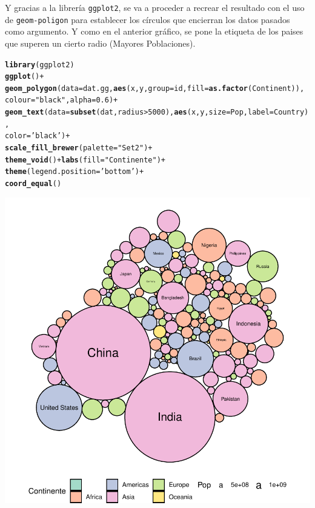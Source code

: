 \documentclass{article}\usepackage[]{graphicx}\usepackage[]{color}
\makeatletter
\def\maxwidth{ %
  \ifdim\Gin@nat@width>\linewidth
    \linewidth
  \else
    \Gin@nat@width
  \fi
}
\newcommand{\hlnum}[1]{\textcolor[rgb]{0.686,0.059,0.569}{#1}}%
\newcommand{\hlstr}[1]{\textcolor[rgb]{0.192,0.494,0.8}{#1}}%
\newcommand{\hlopt}[1]{\textcolor[rgb]{0,0,0}{#1}}%
\newcommand{\hlstd}[1]{\textcolor[rgb]{0.345,0.345,0.345}{#1}}%
\newcommand{\hlkwc}[1]{\textcolor[rgb]{0.333,0.667,0.333}{#1}}%
\newcommand{\hlkwd}[1]{\textcolor[rgb]{0.737,0.353,0.396}{\textbf{#1}}}%
\newenvironment{kframe}{%
 \def\at@end@of@kframe{}%
 \ifinner\ifhmode%
  \def\at@end@of@kframe{\end{minipage}}%
  \begin{minipage}{\columnwidth}%
 \fi\fi%
 \def\FrameCommand##1{\hskip\@totalleftmargin \hskip-\fboxsep
 \colorbox{shadecolor}{##1}\hskip-\fboxsep
     \hskip-\linewidth \hskip-\@totalleftmargin \hskip\columnwidth}%
 \MakeFramed {\advance\hsize-\width
   \@totalleftmargin\z@ \linewidth\hsize
   \@setminipage}}%
 {\par\unskip\endMakeFramed%
 \at@end@of@kframe}
\newenvironment{knitrout}{}{} %
\makeatother
\begin{document}
Y gracias a la librer\'ia \texttt{ggplot2}, se va a proceder a recrear el resultado con el uso de \texttt{geom-poligon} para establecer los c\'irculos que encierran los datos pasados como argumento. Y como en el anterior gr\'afico, se pone la etiqueta de los paises que superen un cierto radio (Mayores Poblaciones).
\begin{knitrout}
\color{fgcolor}\begin{kframe}
\begin{alltt}
\hlkwd{library}\hlstd{(ggplot2)}
\hlkwd{ggplot}\hlstd{()} \hlopt{+}
  \hlkwd{geom_polygon}\hlstd{(}\hlkwc{data} \hlstd{= dat.gg,} \hlkwd{aes}\hlstd{(x, y,} \hlkwc{group} \hlstd{= id,} \hlkwc{fill}\hlstd{=}\hlkwd{as.factor}\hlstd{(Continent)),}
               \hlkwc{colour} \hlstd{=} \hlstr{"black"}\hlstd{,} \hlkwc{alpha} \hlstd{=} \hlnum{0.6}\hlstd{)} \hlopt{+}
  \hlkwd{geom_text}\hlstd{(}\hlkwc{data} \hlstd{=} \hlkwd{subset}\hlstd{(dat, radius} \hlopt{>} \hlnum{5000}\hlstd{),} \hlkwd{aes}\hlstd{(x, y,} \hlkwc{size}\hlstd{=Pop,} \hlkwc{label} \hlstd{= Country),}
            \hlkwc{color} \hlstd{=} \hlstr{'black'}\hlstd{)} \hlopt{+}
  \hlkwd{scale_fill_brewer}\hlstd{(}\hlkwc{palette} \hlstd{=} \hlstr{"Set2"}\hlstd{)} \hlopt{+}
  \hlkwd{theme_void}\hlstd{()} \hlopt{+} \hlkwd{labs}\hlstd{(}\hlkwc{fill} \hlstd{=} \hlstr{"Continente"}\hlstd{)} \hlopt{+}
  \hlkwd{theme}\hlstd{(}\hlkwc{legend.position}\hlstd{=}\hlstr{'bottom'}\hlstd{)} \hlopt{+}
  \hlkwd{coord_equal}\hlstd{()}
\end{alltt}
\end{kframe}

{\centering \includegraphics[width=\maxwidth]{figure/plot_bu-1} 

}



\end{knitrout}
\end{document}
